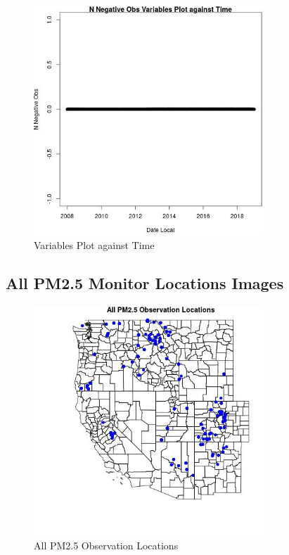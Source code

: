 \begin{figure} 
\centering  
\includegraphics[width=0.77\textwidth]{Code_Outputs/Report_PM25_Step4_part_e_de_duplicated_aves_ML_input_N_Negative_ObsvDate_Local.jpg} 
\caption{\label{fig:Report_PM25_Step4_part_e_de_duplicated_aves_ML_inputN_Negative_ObsvDate_Local}Variables Plot against Time} 
\end{figure} 
 

\subsection{All PM2.5 Monitor Locations Images} 
 

\begin{figure} 
\centering  
\includegraphics[width=0.77\textwidth]{Code_Outputs/Report_PM25_Step4_part_e_de_duplicated_aves_ML_input_PlotLoc0.jpg} 
\caption{\label{fig:Report_PM25_Step4_part_e_de_duplicated_aves_ML_inputPlotLoc0}All PM2.5 Observation Locations} 
\end{figure} 
 


